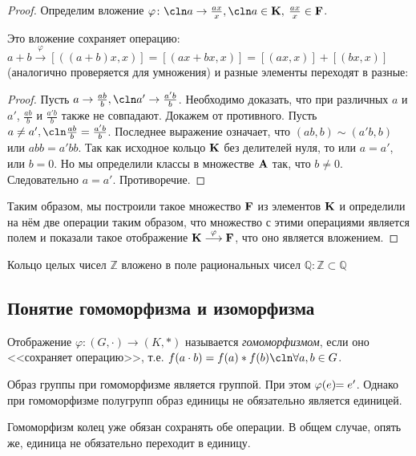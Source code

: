 \begin{proof}
Определим вложение $\varphi\colon\cln a\rightarrow\frac{ax}{x},\cln a\in\Kb,\:\frac{ax}{x}\in\Fb$.

Это вложение сохраняет операцию: $a+b\stackrel{\varphi}{\longrightarrow} [((a+b)x,x)] =[(ax+bx, x)]=[(ax,x)] + [(bx,x)]$ (аналогично проверяется для умножения) и разные элементы переходят в разные:

\begin{proof}
  Пусть $a \to \frac{ab}{b},\cln a'\to \frac{a'b}{b}$. Необходимо
  доказать, что при различных $a$ и $a'$, $\frac{ab}{b}$ и
  $\frac{a'b}{b}$ также не совпадают. Докажем от противного. Пусть
  $a\ne a',\cln \frac{ab}{b}=\frac{a'b}{b}$. Последнее выражение
  означает, что $(ab,b)\sim(a'b,b)$ или $abb=a'bb$. Так как исходное
  кольцо $\mathbf{K}$ без делителей нуля, то или $a=a'$, или $b=0$. Но мы
  определили классы в множестве $\mathbf{A}$ так, что $b\ne 0$. Следовательно
  $a=a'$. Противоречие.
\end{proof}

Таким образом, мы построили такое множество $\mathbf{F}$ из элементов $\mathbf{K}$ и определили на нём две операции таким образом, что множество с этими операциями является полем и показали такое отображение $\mathbf{K} \stackrel{\varphi}{\longrightarrow} \mathbf{F}$, что оно является вложением.
\end{proof}

\begin{ex}
Кольцо целых чисел $\mathbb Z$ вложено в поле рациональных чисел $\mathbb Q\colon\mathbb Z \subset \mathbb Q$
\end{ex}

\subsection{Понятие гомоморфизма и изоморфизма}

\begin{df}
Отображение $\varphi\colon (G,\cdot)\to(K,*)$ называется \emph{гомоморфизмом}, если оно <<сохраняет операцию>>, т.е. $f(a\cdot b)=f(a)*f(b)\cln\forall a,b\in G$.
\end{df}

\begin{stm}
  Образ группы при гомоморфизме является группой. При этом $\varphi(e)\!\!\bw=e'$. Однако при гомоморфизме полугрупп образ единицы не обязательно является единицей.
\end{stm}

Гомоморфизм колец уже обязан сохранять обе операции. В общем случае, опять же, единица не обязательно переходит в единицу.


